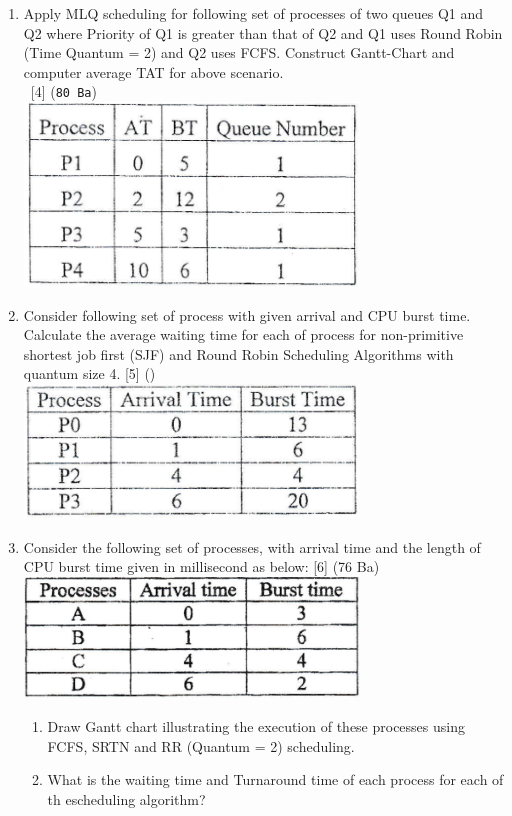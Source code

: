 \documentclass[12pt]{article}
\newcommand{\enter}{\\\textcolor{white}{1}}
\begin{document}
\begin{enumerate}
			\item Apply MLQ scheduling for following set of processes of two queues Q1 and Q2 where Priority of Q1 is greater than that of Q2 and Q1 uses Round Robin (Time Quantum = 2) and Q2 uses FCFS. Construct Gantt-Chart and computer average TAT for above scenario.
			\enter \hfill [4] (\texttt{80 Ba})\\
			\includegraphics[width=3.5in]{./pics/os_5}
			
			\item Consider following set of process with given arrival and CPU burst time. Calculate the average waiting time for each of process for non-primitive shortest job first (SJF) and Round Robin Scheduling Algorithms with quantum size 4. \hfill [5] ()\\
			\includegraphics[width=3.5in]{./pics/os_6}
			
			\item Consider the following set of processes, with arrival time and the length of CPU burst time given in millisecond as below: \hfill [6] (76 Ba)\\
			\includegraphics[width=3.5in]{./pics/os_10}\\
			\begin{enumerate}[noitemsep, topsep = 0pt, label = \alph*.]
				\item Draw Gantt chart illustrating the execution of these processes using FCFS, SRTN and RR (Quantum = 2) scheduling.
				\item What is the waiting time and Turnaround time of each process for each of th escheduling algorithm?
			\end{enumerate}
			

\end{enumerate}
\end{document}
